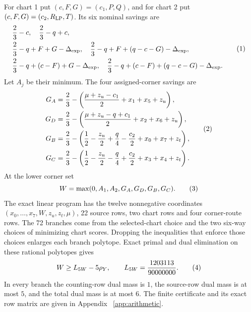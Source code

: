 For chart 1 put \((c,F,G)=(c_1,P,Q)\), and for chart 2 put
\((c,F,G)=(c_2,R_{\rm LP},T)\). Its six nominal savings are
\[
\begin{aligned}
 &\frac23-c,\quad \frac23-q+c,\\
 &\frac23-q+F+G-\Delta_{\rm exp},\quad
 \frac23-q+F+(q-c-G)-\Delta_{\rm exp},\\
 &\frac23-q+(c-F)+G-\Delta_{\rm exp},\quad
 \frac23-q+(c-F)+(q-c-G)-\Delta_{\rm exp}.
\end{aligned}
\AutoTag{eq:old:7_19}
\]
Let \(A_j\) be their minimum. The four assigned-corner savings are
\[
\begin{aligned}
 G_A&=\frac23-\left(\frac{\mu+z_u-c_1}{2}+x_1+x_5+z_u\right),\\
 G_D&=\frac23-\left(\frac{\mu+z_u-q+c_1}{2}+x_2+x_6+z_u\right),\\
 G_B&=\frac23-\left(\frac12-\frac{z_u}{2}+\frac q4-\frac{c_2}{2}
                   +x_0+x_7+z_t\right),\\
 G_C&=\frac23-\left(\frac12-\frac{z_u}{2}-\frac q4+\frac{c_2}{2}
                   +x_3+x_4+z_t\right).
\end{aligned}
\AutoTag{eq:old:7_20}
\]
At the lower corner set
\[
 W=\max(0,A_1,A_2,G_A,G_D,G_B,G_C).
\AutoTag{eq:old:7_21}
\]
The exact linear program has the twelve nonnegative coordinates
\((x_0,\ldots,x_7,W,z_u,z_t,\mu)\), 22 source rows, two chart rows
and four corner-route rows. The 72 branches come from the selected-chart
choice and the two six-way choices of minimizing chart scores. Dropping the
inequalities that enforce those choices enlarges each branch polytope.
Exact primal and dual elimination on these rational polytopes gives
\[
 W\ge L_{5W}-5\rho_Y,\qquad
 L_{5W}=\frac{1203113}{90000000}.
\AutoTag{eq:old:7_22}
\]
In every branch the counting-row dual mass is \(1\), the source-row dual
mass is at most \(5\), and the total dual mass is at most \(6\). The finite
certificate and its exact row matrix are given in Appendix
~\ref{app:arithmetic}.

